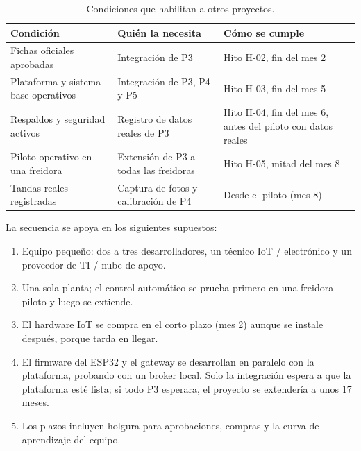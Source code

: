 \begin{table}[H]
  \centering
  \renewcommand{\arraystretch}{1.3}
  \small
  \begin{tabularx}{\textwidth}{|L{4.4cm}|L{4.4cm}|X|}
    \hline
    {\color{white}\bfseries Condición} &
    {\color{white}\bfseries Quién la necesita} &
    {\color{white}\bfseries Cómo se cumple} \\ \hline
    Fichas oficiales aprobadas & Integración de P3 & Hito H-02, fin del mes 2 \\ \hline
    Plataforma y sistema base operativos & Integración de P3, P4 y P5 & Hito H-03, fin del mes 5 \\ \hline
    Respaldos y seguridad activos & Registro de datos reales de P3 & Hito H-04, fin del mes 6, antes del piloto con datos reales \\ \hline
    Piloto operativo en una freidora & Extensión de P3 a todas las freidoras & Hito H-05, mitad del mes 8 \\ \hline
    Tandas reales registradas & Captura de fotos y calibración de P4 & Desde el piloto (mes 8) \\ \hline
  \end{tabularx}
  \caption{Condiciones que habilitan a otros proyectos.}
  \label{tab:f_condiciones}
\end{table}

La secuencia se apoya en los siguientes supuestos:

\begin{enumerate}
  \item Equipo pequeño: dos a tres desarrolladores, un técnico IoT / electrónico y un proveedor de TI / nube de apoyo.
  \item Una sola planta; el control automático se prueba primero en una freidora piloto y luego se extiende.
  \item El hardware IoT se compra en el corto plazo (mes 2) aunque se instale después, porque tarda en llegar.
  \item El firmware del ESP32 y el gateway se desarrollan en paralelo con la plataforma, probando con un broker local. Solo la integración espera a que la plataforma esté lista; si todo P3 esperara, el proyecto se extendería a unos 17 meses.
  \item Los plazos incluyen holgura para aprobaciones, compras y la curva de aprendizaje del equipo.
\end{enumerate}

